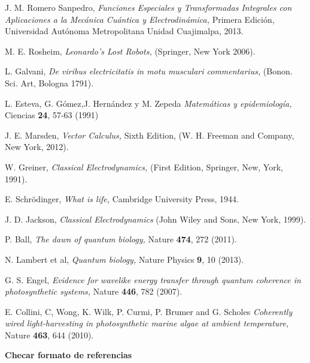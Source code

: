 \documentclass[letterpaper,12pt,oneside]{book}
\begin{document}
 \begin{thebibliography}{99}



J. M. Romero Sanpedro, {\it Funciones Especiales y Transformadas Integrales con Aplicaciones a la Mec\'anica Cu\'antica y Electrodin\'amica,} Primera Edici\'on, Universidad Aut\'onoma Metropolitana Unidad Cuajimalpa, 2013.

M. E. Rosheim, {\it  Leonardo's Lost Robots,} (Springer, New York 2006).

L. Galvani, {\it  De viribus electricitatis in motu musculari commentarius,} (Bonon. Sci. Art, Bologna 1791).

L. Esteva, G. G\'omez,J. Hern\'andez y M. Zepeda {\it Matem\'aticas y epidemiolog\'ia,} Ciencias {\bf 24}, 57-63  (1991)

J. E. Marsden, {\it Vector Calculus,} Sixth Edition, (W. H. Freeman and Company, New York, 2012).

W. Greiner, {\it Classical Electrodynamics,} (First Edition, Springer, New, York, 1991).

E. Schr\"odinger, {\it What is life,} Cambridge University Press, 1944.

J. D. Jackson, {\it  Classical Electrodynamics}  (John Wiley and Sons, New York, 1999).

P. Ball, {\it The dawn of quantum biology,} Nature {\bf 474}, 272  (2011).

N. Lambert et al, {\it Quantum biology,} Nature Physics {\bf 9}, 10  (2013).

G. S. Engel, {\it Evidence for wavelike energy transfer through quantum coherence in photosynthetic systems,} Nature {\bf 446}, 782  (2007).

E. Collini, C, Wong, K. Wilk, P. Curmi, P. Brumer and G. Scholes {\it Coherently wired light-harvesting in photosynthetic marine algae at ambient temperature,} Nature {\bf 463}, 644  (2010).

{\bf Checar  formato de referencias}

\end{thebibliography}



  
\end{document}
